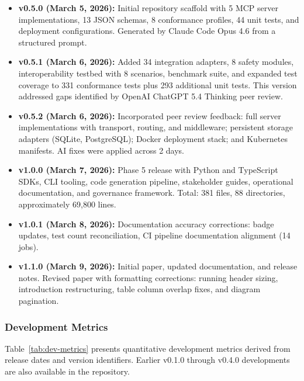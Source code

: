 \documentclass{article}
\begin{document}
\begin{itemize}[leftmargin=*]
\item \textbf{v0.5.0 (March 5, 2026):} Initial repository scaffold with 5 MCP server implementations, 13 JSON schemas, 8 conformance profiles, 44 unit tests, and deployment configurations. Generated by Claude Code Opus 4.6 from a structured prompt.

\item \textbf{v0.5.1 (March 6, 2026):} Added 34 integration adapters, 8 safety modules, interoperability testbed with 8 scenarios, benchmark suite, and expanded test coverage to 331 conformance tests plus 293 additional unit tests. This version addressed gaps identified by OpenAI ChatGPT 5.4 Thinking peer review.

\item \textbf{v0.5.2 (March 6, 2026):} Incorporated peer review feedback: full server implementations with transport, routing, and middleware; persistent storage adapters (SQLite, PostgreSQL); Docker deployment stack; and Kubernetes manifests. AI fixes were applied across 2 days.

\item \textbf{v1.0.0 (March 7, 2026):} Phase 5 release with Python and TypeScript SDKs, CLI tooling, code generation pipeline, stakeholder guides, operational documentation, and governance framework. Total: 381 files, 88 directories, approximately 69,800 lines.

\item \textbf{v1.0.1 (March 8, 2026):} Documentation accuracy corrections: badge updates, test count reconciliation, CI pipeline documentation alignment (14 jobs).

\item \textbf{v1.1.0 (March 9, 2026):} Initial paper, updated documentation, and release notes. Revised paper with formatting corrections: running header sizing, introduction restructuring, table column overlap fixes, and diagram pagination.
\end{itemize}

\subsubsection{Development Metrics}

Table~\ref{tab:dev-metrics} presents quantitative development metrics derived from release dates and version identifiers. Earlier v0.1.0 through v0.4.0 developments are also available in the repository. 
\end{document}
